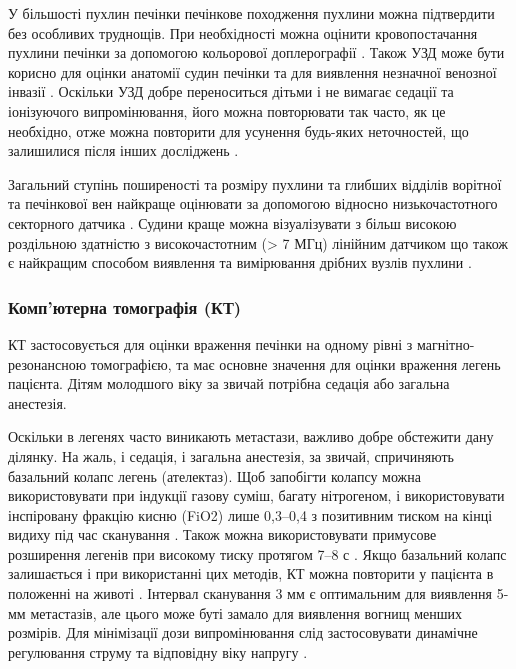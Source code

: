 У більшості пухлин печінки печінкове походження пухлини можна підтвердити без особливих труднощів. При необхідності можна оцінити кровопостачання пухлини печінки за допомогою кольорової доплерографії \cite{pmid22648963}. Також УЗД може бути корисно для оцінки анатомії судин печінки та для виявлення незначної венозної інвазії \cite{pmid16123986}. Оскільки УЗД добре переноситься дітьми і не вимагає седації та іонізуючого випромінювання, його можна повторювати так часто, як це необхідно, отже можна повторити для усунення будь-яких неточностей, що залишилися після інших досліджень \cite{pmid16176410}.

Загальний ступінь поширеності та розміру пухлини та глибших відділів ворітної та печінкової вен найкраще оцінювати за допомогою відносно низькочастотного секторного датчика \cite{pmid16185597}. Судини краще можна візуалізувати з більш високою роздільною здатністю з високочастотним (> 7 МГц) лінійним датчиком що також є найкращим способом виявлення та вимірювання дрібних вузлів пухлини \cite{pmid16404555}.
\subsubsection{Комп’ютерна томографія (КТ)} 

КТ застосовується для оцінки враження печінки на одному рівні з магнітно-резонансною томографією, та має основне значення для оцінки враження легень пацієнта. Дітям молодшого віку за звичай потрібна седація або загальна анестезія.

Оскільки в легенях часто виникають метастази, важливо добре обстежити дану ділянку. На жаль, і седація, і загальна анестезія, за звичай, спричиняють базальний колапс легень (ателектаз).  Щоб запобігти колапсу можна використовувати при індукції газову суміш, багату нітрогеном, і використовувати інспіровану фракцію кисню (FiO2) лише 0,3–0,4 з позитивним тиском на кінці видиху під час сканування \cite{pmid16651244}. Також можна використовувати примусове розширення легенів при високому тиску протягом 7–8 с \cite{pmid15285242}. Якщо базальний колапс залишається і при використанні цих методів, КТ можна повторити у пацієнта в положенні на животі \cite{pmid16712615}.
Інтервал сканування 3 мм є оптимальним для виявлення 5-мм метастазів, але цього може буті замало для виявлення вогнищ менших розмірів. Для мінімізації дози випромінювання слід застосовувати динамічне регулювання струму та відповідну віку напругу \cite{pmid16794509}.

